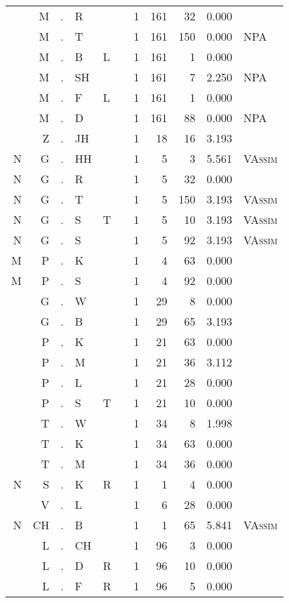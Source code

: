 \begin{longtable}{r@{ } r@{ } c@{ } l@{ } l@{ } l@{ } r r r r l }
 & M & . & R &  &  & 1 & 161 & 32 & 0.000 &  \\
 & M & . & T &  &  & 1 & 161 & 150 & 0.000 & \textsc{NPA} \\
 & M & . & B & L &  & 1 & 161 & 1 & 0.000 &  \\
 & M & . & SH &  &  & 1 & 161 & 7 & 2.250 & \textsc{NPA} \\
 & M & . & F & L &  & 1 & 161 & 1 & 0.000 &  \\
 & M & . & D &  &  & 1 & 161 & 88 & 0.000 & \textsc{NPA} \\
 & Z & . & JH &  &  & 1 & 18 & 16 & 3.193 &  \\
N & G & . & HH &  &  & 1 & 5 & 3 & 5.561 & \textsc{VAssim} \\
N & G & . & R &  &  & 1 & 5 & 32 & 0.000 &  \\
N & G & . & T &  &  & 1 & 5 & 150 & 3.193 & \textsc{VAssim} \\
N & G & . & S & T &  & 1 & 5 & 10 & 3.193 & \textsc{VAssim} \\
N & G & . & S &  &  & 1 & 5 & 92 & 3.193 & \textsc{VAssim} \\
M & P & . & K &  &  & 1 & 4 & 63 & 0.000 &  \\
M & P & . & S &  &  & 1 & 4 & 92 & 0.000 &  \\
 & G & . & W &  &  & 1 & 29 & 8 & 0.000 &  \\
 & G & . & B &  &  & 1 & 29 & 65 & 3.193 &  \\
 & P & . & K &  &  & 1 & 21 & 63 & 0.000 &  \\
 & P & . & M &  &  & 1 & 21 & 36 & 3.112 &  \\
 & P & . & L &  &  & 1 & 21 & 28 & 0.000 &  \\
 & P & . & S & T &  & 1 & 21 & 10 & 0.000 &  \\
 & T & . & W &  &  & 1 & 34 & 8 & 1.998 &  \\
 & T & . & K &  &  & 1 & 34 & 63 & 0.000 &  \\
 & T & . & M &  &  & 1 & 34 & 36 & 0.000 &  \\
N & S & . & K & R &  & 1 & 1 & 4 & 0.000 &  \\
 & V & . & L &  &  & 1 & 6 & 28 & 0.000 &  \\
N & CH & . & B &  &  & 1 & 1 & 65 & 5.841 & \textsc{VAssim} \\
 & L & . & CH &  &  & 1 & 96 & 3 & 0.000 &  \\
 & L & . & D & R &  & 1 & 96 & 10 & 0.000 &  \\
 & L & . & F & R &  & 1 & 96 & 5 & 0.000 &  \\

\end{longtable}
